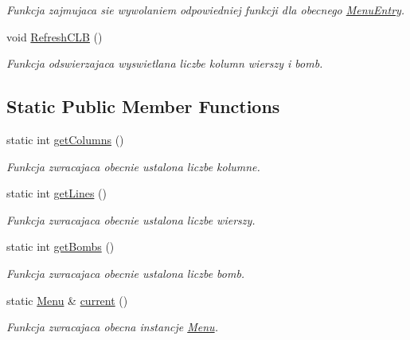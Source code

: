 \begin{DoxyCompactItemize}
\begin{DoxyCompactList}\small\item\em Funkcja zajmujaca sie wywolaniem odpowiedniej funkcji dla obecnego \hyperlink{class_menu_entry}{Menu\+Entry}. \end{DoxyCompactList}\item 
\hypertarget{class_menu_a1166aeaa1849a13d80291ea0a734415f}{}void \hyperlink{class_menu_a1166aeaa1849a13d80291ea0a734415f}{Refresh\+C\+L\+B} ()\label{class_menu_a1166aeaa1849a13d80291ea0a734415f}

\begin{DoxyCompactList}\small\item\em Funkcja odswierzajaca wyswietlana liczbe kolumn wierszy i bomb. \end{DoxyCompactList}\end{DoxyCompactItemize}
\subsection*{Static Public Member Functions}
\begin{DoxyCompactItemize}
\item 
static int \hyperlink{class_menu_a7b0fbc17641f35b4d5cdab708b14c659}{get\+Columns} ()
\begin{DoxyCompactList}\small\item\em Funkcja zwracajaca obecnie ustalona liczbe kolumne. \end{DoxyCompactList}\item 
static int \hyperlink{class_menu_a36ba53f24eacd853bc98da7a4fff291d}{get\+Lines} ()
\begin{DoxyCompactList}\small\item\em Funkcja zwracajaca obecnie ustalona liczbe wierszy. \end{DoxyCompactList}\item 
static int \hyperlink{class_menu_a4654d30d5950859f8cd3ca4bb4d6774a}{get\+Bombs} ()
\begin{DoxyCompactList}\small\item\em Funkcja zwracajaca obecnie ustalona liczbe bomb. \end{DoxyCompactList}\item 
static \hyperlink{class_menu}{Menu} \& \hyperlink{class_menu_a2388f6a7d18a9866cb81a8741d2dc2d2}{current} ()
\begin{DoxyCompactList}\small\item\em Funkcja zwracajaca obecna instancje \hyperlink{class_menu}{Menu}. \end{DoxyCompactList}\end{DoxyCompactItemize}


